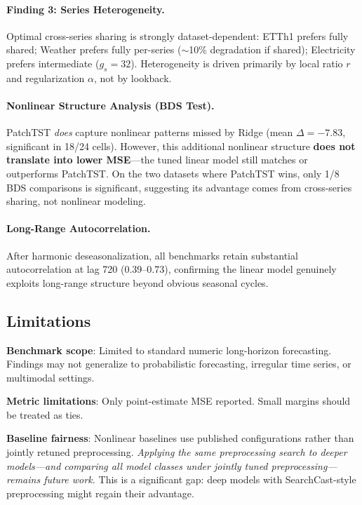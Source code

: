 \documentclass[11pt,a4paper]{article}
\begin{document}
\paragraph{Finding 3: Series Heterogeneity.} Optimal cross-series sharing is strongly dataset-dependent: ETTh1 prefers fully shared; Weather prefers fully per-series ($\sim$10\% degradation if shared); Electricity prefers intermediate ($g_s = 32$). Heterogeneity is driven primarily by local ratio $r$ and regularization $\alpha$, not by lookback.

\paragraph{Nonlinear Structure Analysis (BDS Test).} PatchTST \emph{does} capture nonlinear patterns missed by Ridge (mean $\Delta = -7.83$, significant in 18/24 cells). However, this additional nonlinear structure \textbf{does not translate into lower MSE}---the tuned linear model still matches or outperforms PatchTST. On the two datasets where PatchTST wins, only 1/8 BDS comparisons is significant, suggesting its advantage comes from cross-series sharing, not nonlinear modeling.

\paragraph{Long-Range Autocorrelation.} After harmonic deseasonalization, all benchmarks retain substantial autocorrelation at lag 720 (0.39--0.73), confirming the linear model genuinely exploits long-range structure beyond obvious seasonal cycles.

\subsection{Limitations}

\textbf{Benchmark scope}: Limited to standard numeric long-horizon forecasting. Findings may not generalize to probabilistic forecasting, irregular time series, or multimodal settings.

\textbf{Metric limitations}: Only point-estimate MSE reported. Small margins should be treated as ties.

\textbf{Baseline fairness}: Nonlinear baselines use published configurations rather than jointly retuned preprocessing. \emph{Applying the same preprocessing search to deeper models---and comparing all model classes under jointly tuned preprocessing---remains future work.} This is a significant gap: deep models with SearchCast-style preprocessing might regain their advantage.
\end{document}
